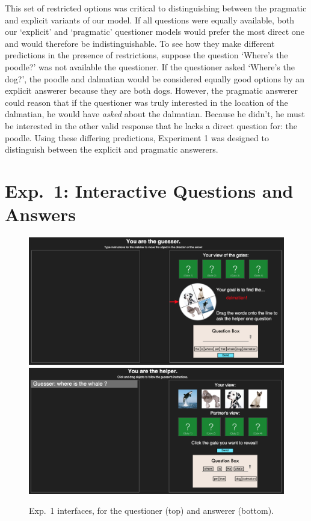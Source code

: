 \documentclass[12pt, floatsintext, jou]{apa6}
\begin{document}
This set of restricted options was critical to distinguishing between the pragmatic and explicit variants of our model. If all questions were equally available, both our `explicit' and `pragmatic' questioner models would prefer the most direct one and would therefore be indistinguishable. To see how they make different predictions in the presence of restrictions, suppose the question `Where's the poodle?' was not available the questioner. If the questioner asked `Where's the dog?', the poodle and dalmatian would be considered equally good options by an explicit answerer because they are both dogs. However, the pragmatic answerer could reason that if the questioner was truly interested in the location of the dalmatian, he would have \emph{asked} about the dalmatian. Because he didn't, he must be interested in the other valid response that he lacks a direct question for: the poodle. Using these differing predictions, Experiment 1 was designed to distinguish between the explicit and pragmatic answerers. 

\section{Exp.~1: Interactive Questions and Answers}

	\begin{figure}[t!]
\begin{center}
\includegraphics[scale = .3]{Exp3GuesserView}
\includegraphics[scale = .3]{Exp3HelperView}
\end{center}
\caption{Exp.~1 interfaces, for the questioner (top) and answerer (bottom).}
\label{fig:exp3views}
\end{figure}
\end{document}
